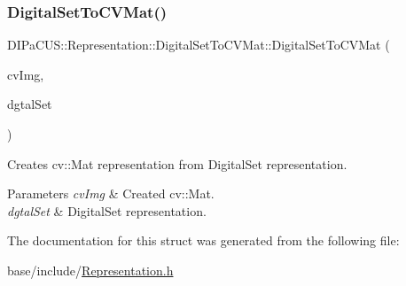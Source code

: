 \subsubsection{\texorpdfstring{Digital\+Set\+To\+C\+V\+Mat()}{DigitalSetToCVMat()}}
{\footnotesize\ttfamily D\+I\+Pa\+C\+U\+S\+::\+Representation\+::\+Digital\+Set\+To\+C\+V\+Mat\+::\+Digital\+Set\+To\+C\+V\+Mat (\begin{DoxyParamCaption}\item[{cv\+::\+Mat \&}]{cv\+Img,  }\item[{const \mbox{\hyperlink{structDIPaCUS_1_1Representation_1_1DigitalSetToCVMat_a476ca922b6635faab97aa112341663a9}{Digital\+Set}} \&}]{dgtal\+Set }\end{DoxyParamCaption})}



Creates cv\+::\+Mat representation from Digital\+Set representation. 


\begin{DoxyParams}{Parameters}
{\em cv\+Img} & Created cv\+::\+Mat. \\
\hline
{\em dgtal\+Set} & Digital\+Set representation. \\
\hline
\end{DoxyParams}


The documentation for this struct was generated from the following file\+:\begin{DoxyCompactItemize}
\item 
base/include/\mbox{\hyperlink{Representation_8h}{Representation.\+h}}\end{DoxyCompactItemize}
